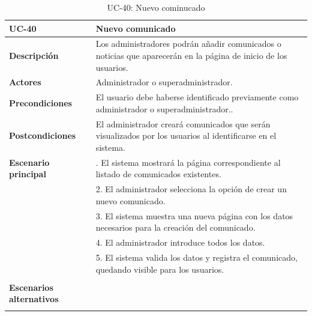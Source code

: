 \begin{table}
  \begin{center}
    \begin{tabularx}{16.4cm}{|l|X|}
      \hline
      \textbf{UC-40} & \textbf{Nuevo comunicado}\\
      \hline
      \textbf{Descripción} & Los administradores podrán añadir comunicados o noticias que aparecerán en la página de inicio de los usuarios. \\
      \hline
      \textbf{Actores} & Administrador o superadministrador.\\
      \hline
      \textbf{Precondiciones} & El usuario debe haberse identificado previamente como administrador o superadministrador..\\
      \hline
      \textbf{Postcondiciones} & El administrador creará comunicados que serán visualizados por los usuarios al identificarse en el sistema. \\
      \hline
      \textbf{Escenario principal} & \smallskip 1. El sistema mostrará la página correspondiente al listado de comunicados existentes.\\
      & 2. El administrador selecciona la opción de crear un nuevo comunicado. \\
      & 3. El sistema muestra una nueva página con los datos necesarios para la creación del comunicado.\\
      & 4. El administrador introduce todos los datos.\\
      & 5. El sistema valida los datos y registra el comunicado, quedando visible para los usuarios.\\
      & \\
      \hline
      \textbf{Escenarios alternativos} & \\
      & \\
      \hline
    \end{tabularx}
    \caption{UC-40: Nuevo cominucado}
    \label{tab:CU-nuevo-comunicado}
  \end{center}
\end{table}


